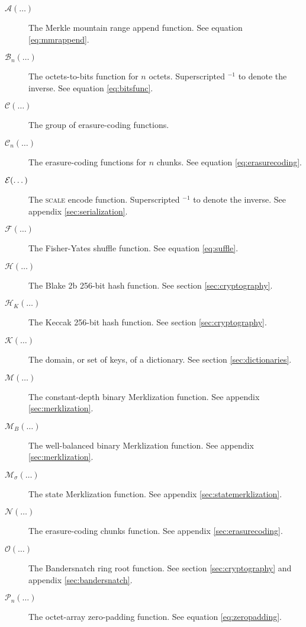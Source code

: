 \begin{description}
  \item[$\mathcal{A}(\dots)$] The Merkle mountain range append function. See equation \ref{eq:mmrappend}.
  \item[$\mathcal{B}_n(\dots)$] The octets-to-bits function for $n$ octets. Superscripted ${}^{-1}$ to denote the inverse. See equation \ref{eq:bitsfunc}.
  \item[$\mathcal{C}(\dots)$] The group of erasure-coding functions.
  \item[$\mathcal{C}_n(\dots)$] The erasure-coding functions for $n$ chunks. See equation \ref{eq:erasurecoding}.
  \item[$\mathcal{E}(\dots)$] The \textsc{scale} encode function. Superscripted ${}^{-1}$ to denote the inverse. See appendix \ref{sec:serialization}.
  \item[$\mathcal{F}(\dots)$] The Fisher-Yates shuffle function. See equation \ref{eq:suffle}.
  \item[$\mathcal{H}(\dots)$] The Blake 2b 256-bit hash function. See section \ref{sec:cryptography}.
  \item[$\mathcal{H}_K(\dots)$] The Keccak 256-bit hash function. See section \ref{sec:cryptography}.
  \item[$\mathcal{K}(\dots)$] The domain, or set of keys, of a dictionary. See section \ref{sec:dictionaries}.
  \item[$\mathcal{M}(\dots)$] The constant-depth binary Merklization function. See appendix \ref{sec:merklization}.
  \item[$\mathcal{M}_B(\dots)$] The well-balanced binary Merklization function. See appendix \ref{sec:merklization}.
  \item[$\mathcal{M}_\sigma(\dots)$] The state Merklization function. See appendix \ref{sec:statemerklization}.
  \item[$\mathcal{N}(\dots)$] The erasure-coding chunks function. See appendix \ref{sec:erasurecoding}.
  \item[$\mathcal{O}(\dots)$] The Bandersnatch ring root function. See section \ref{sec:cryptography} and appendix \ref{sec:bandersnatch}.
  \item[$\mathcal{P}_n(\dots)$] The octet-array zero-padding function. See equation \ref{eq:zeropadding}.

\end{description}

